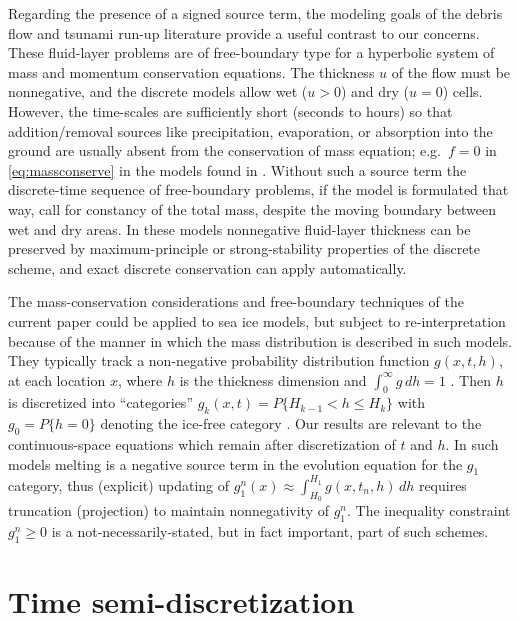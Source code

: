 \documentclass[final,onefignum]{siamart190516}
\begin{document}
Regarding the presence of a signed source term, the modeling goals of the debris flow \cite{GeorgeIverson2014} and tsunami run-up \cite{LeVequeetal2011} literature provide a useful contrast to our concerns.  These fluid-layer problems are of free-boundary type for a hyperbolic system of mass and momentum conservation equations.  The thickness $u$ of the flow must be nonnegative, and the discrete models allow wet ($u>0$) and dry ($u=0$) cells.  However, the time-scales are sufficiently short (seconds to hours) so that addition/removal sources like precipitation, evaporation, or absorption into the ground are usually absent from the conservation of mass equation; e.g.~$f=0$ in \eqref{eq:massconserve} in the models found in \cite{GeorgeIverson2014,LeVequeetal2011}.  Without such a source term the discrete-time sequence of free-boundary problems, if the model is formulated that way, call for constancy of the total mass, despite the moving boundary between wet and dry areas.  In these models nonnegative fluid-layer thickness can be preserved by maximum-principle or strong-stability properties of the discrete scheme, and exact discrete conservation can apply automatically.

The mass-conservation considerations and free-boundary techniques of the current paper could be applied to sea ice models, but subject to re-interpretation because of the manner in which the mass distribution is described in such models.  They typically track a non-negative probability distribution function $g(x,t,h)$, at each location $x$, where $h$ is the thickness dimension and $\int_0^\infty g\,dh = 1$ \cite[for example]{Thorndikeetal1975}.  Then $h$ is discretized into ``categories'' $g_k(x,t) = P\{H_{k-1} < h \le H_k\}$ with $g_0 = P\{h=0\}$ denoting the ice-free category \cite{LipscombHunke2004}.  Our results are relevant to the continuous-space equations which remain after discretization of $t$ and $h$.  In such models melting is a negative source term in the evolution equation for the $g_1$ category, thus (explicit) updating of $g_1^n(x) \approx \int_{H_0}^{H_1} g(x,t_n,h)\,dh$ requires truncation (projection) to maintain nonnegativity of $g_1^n$.  The inequality constraint $g_1^n \ge 0$ is a not-necessarily-stated, but in fact important, part of such schemes.


\section{Time semi-discretization}  \label{sec:strongform}
\end{document}
